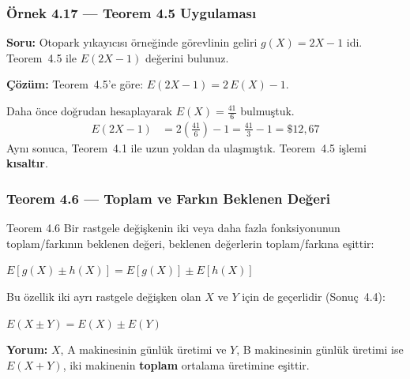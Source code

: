 \documentclass[light]{lutbeamer}
\begin{document}
\begin{frame}[fragile]
  \frametitle[Örnek 4.17]{Örnek 4.17 --- Teorem 4.5 Uygulaması}

  \smallskip
  \textbf{Soru:} Otopark yıkayıcısı örneğinde görevlinin geliri $g(X) = 2X - 1$ idi. Teorem~4.5 ile $E(2X - 1)$ değerini bulunuz.

  \medskip
  \textbf{Çözüm:} Teorem~4.5'e göre: $E(2X - 1) = 2\,E(X) - 1$.

  Daha önce doğrudan hesaplayarak $E(X) = \frac{41}{6}$ bulmuştuk.
  \begin{align*}
    E(2X - 1) &= 2\left(\frac{41}{6}\right) - 1 = \frac{41}{3} - 1 = \$12{,}67
  \end{align*}
  Aynı sonuca, Teorem~4.1 ile uzun yoldan da ulaşmıştık. Teorem~4.5 işlemi \textbf{kısaltır}.
\end{frame}

\begin{frame}[fragile]
  \frametitle{Teorem 4.6 --- Toplam ve Farkın Beklenen Değeri}
  \begin{center}
    \begin{minipage}{0.95\textwidth}
      \begin{block}{Teorem 4.6}
        Bir rastgele değişkenin iki veya daha fazla fonksiyonunun toplam/farkının beklenen değeri, beklenen değerlerin toplam/farkına eşittir:
        \begin{center}
          $E[g(X) \pm h(X)] = E[g(X)] \pm E[h(X)]$
        \end{center}
      \end{block}
    \end{minipage}
  \end{center}

  \medskip
  Bu özellik iki ayrı rastgele değişken olan $X$ ve $Y$ için de geçerlidir (Sonuç~4.4):
  \begin{center}
    $E(X \pm Y) = E(X) \pm E(Y)$
  \end{center}

  {\small \textbf{Yorum:} $X$, A makinesinin günlük üretimi ve $Y$, B makinesinin günlük üretimi ise $E(X+Y)$, iki makinenin \textbf{toplam} ortalama üretimine eşittir.}
\end{frame}
\end{document}
